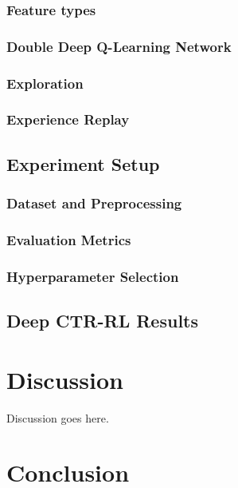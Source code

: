\documentclass{mldsmsc}
\begin{document}
\subsection{Feature types}

\subsection{Double Deep Q-Learning Network}

\subsection{Exploration}

\subsection{Experience Replay}

\section{Experiment Setup}

\subsection{Dataset and Preprocessing}

\subsection{Evaluation Metrics}

\subsection{Hyperparameter Selection}

\section{Deep CTR-RL Results}

\chapter{Discussion}
\label{chap:discussion}

Discussion goes here.

\chapter{Conclusion}
\end{document}
